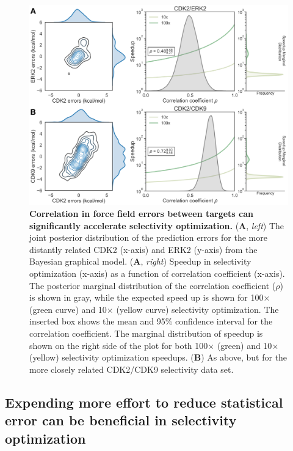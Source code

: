 \documentclass[phd,tocprelim]{cornell}
\begin{document}
\begin{landscape}
\begin{figure}
\centering
\includegraphics[width=0.7\linewidth]{figures/figure5.pdf}
\caption[Correlation in force field errors between targets can significantly accelerate selectivity optimization.]{
{\bf Correlation in force field errors between targets can significantly accelerate selectivity optimization.} 
({\bf A}, \emph{left}) The joint posterior distribution of the prediction errors for the more distantly related CDK2 (x-axis) and ERK2 (y-axis) from the Bayesian graphical model. 
({\bf A}, \emph{right}) Speedup in selectivity optimization (x-axis) as a function of correlation coefficient (x-axis). 
The posterior marginal distribution of the correlation coefficient ($\rho$) is shown in gray, while the expected speed up is shown for 100$\times$ (green curve) and 10$\times$ (yellow curve) selectivity optimization. 
The inserted box shows the mean and 95\% confidence interval for the correlation coefficient. The marginal distribution of speedup is shown on the right side of the plot for both 100$\times$ (green) and 10$\times$ (yellow) selectivity optimization speedups. 
({\bf B}) As above, but for the more closely related CDK2/CDK9 selectivity data set.
}
\label{fig:figure-5}
\end{figure}
\end{landscape}

\subsection{Expending more effort to reduce statistical error can be beneficial in selectivity optimization}
\end{document}
